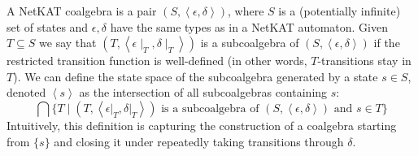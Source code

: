 \documentclass[acmsmall,dvipsnames,nonacm]{acmart}
\newcommand\dup{\mathsf{dup}}
\newcommand\NetKAT{\textsf{NetKAT}\xspace}
\begin{document}

A \NetKAT coalgebra is a pair $(S,\left<\epsilon,\delta\right>)$, where $S$ is a (potentially infinite) set of states and $\epsilon,\delta$ have the same types as in a \NetKAT automaton. Given $T\subseteq S$ we say that $(T,\left<\epsilon\!\!\mid_T,\delta\!\!\mid_T\right>)$ is a subcoalgebra of $(S,\left<\epsilon,\delta\right>)$ if the restricted transition function is well-defined (in other words, $T$-transitions stay in $T$). We can define the state space of the subcoalgebra generated by a state $s\in S$, denoted $\left<s\right>$ as the intersection of all subcoalgebras containing $s$:
\[
\bigcap \{ T \mid (T,\left<\epsilon\vert_T,\delta\vert_T\right>) \text{ is a subcoalgebra of } (S,\left<\epsilon,\delta\right>) \text{ and } s\in T \}
\]
Intuitively, this definition is capturing the construction of a coalgebra starting from $\{s\}$ and closing it under repeatedly taking transitions through $\delta$. 
\end{document}
